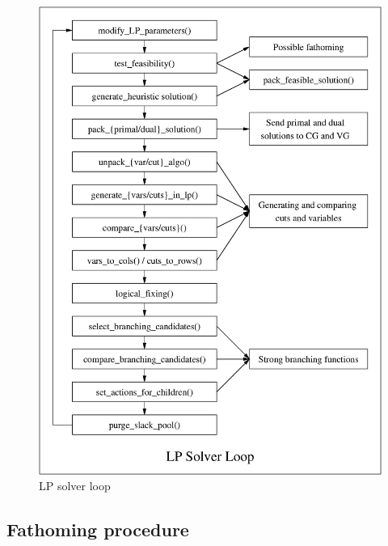 \begin{figure}
\begin{center}
\includegraphics[scale=0.75]{flow-lploop.eps}
\end{center}
\caption{\label{dev:lploop}LP solver loop}
\end{figure}

\subsection{Fathoming procedure}

